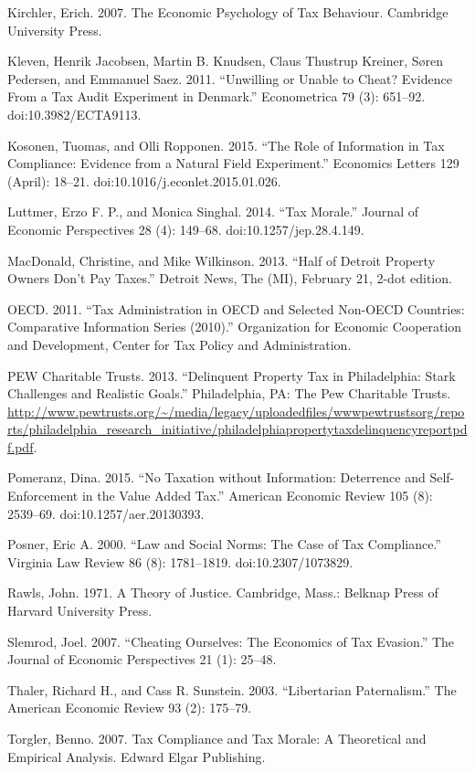 \documentclass[12pt,titlepage]{article}
\begin{document}
Kirchler, Erich. 2007. The Economic Psychology of Tax Behaviour. Cambridge University Press.

Kleven, Henrik Jacobsen, Martin B. Knudsen, Claus Thustrup Kreiner, Søren Pedersen, and Emmanuel Saez. 2011. “Unwilling or Unable to Cheat? Evidence From a Tax Audit Experiment in Denmark.” Econometrica 79 (3): 651–92. doi:10.3982/ECTA9113.

Kosonen, Tuomas, and Olli Ropponen. 2015. “The Role of Information in Tax Compliance: Evidence from a Natural Field Experiment.” Economics Letters 129 (April): 18–21. doi:10.1016/j.econlet.2015.01.026.

Luttmer, Erzo F. P., and Monica Singhal. 2014. “Tax Morale.” Journal of Economic Perspectives 28 (4): 149–68. doi:10.1257/jep.28.4.149.

MacDonald, Christine, and Mike Wilkinson. 2013. “Half of Detroit Property Owners Don’t Pay Taxes.” Detroit News, The (MI), February 21, 2-dot edition.

OECD. 2011. “Tax Administration in OECD and Selected Non-OECD Countries: Comparative Information Series (2010).” Organization for Economic Cooperation and Development, Center for Tax Policy and Administration.

PEW Charitable Trusts. 2013. “Delinquent Property Tax in Philadelphia: Stark Challenges and Realistic Goals.” Philadelphia, PA: The Pew Charitable Trusts. \url{http://www.pewtrusts.org/~/media/legacy/uploadedfiles/wwwpewtrustsorg/reports/philadelphia_research_initiative/philadelphiapropertytaxdelinquencyreportpdf.pdf}.

Pomeranz, Dina. 2015. “No Taxation without Information: Deterrence and Self-Enforcement in the Value Added Tax.” American Economic Review 105 (8): 2539–69. doi:10.1257/aer.20130393.

Posner, Eric A. 2000. “Law and Social Norms: The Case of Tax Compliance.” Virginia Law Review 86 (8): 1781–1819. doi:10.2307/1073829.

Rawls, John. 1971. A Theory of Justice. Cambridge, Mass.: Belknap Press of Harvard University Press.

Slemrod, Joel. 2007. “Cheating Ourselves: The Economics of Tax Evasion.” The Journal of Economic Perspectives 21 (1): 25–48.

Thaler, Richard H., and Cass R. Sunstein. 2003. “Libertarian Paternalism.” The American Economic Review 93 (2): 175–79.

Torgler, Benno. 2007. Tax Compliance and Tax Morale: A Theoretical and Empirical Analysis. Edward Elgar Publishing.
\end{document}
